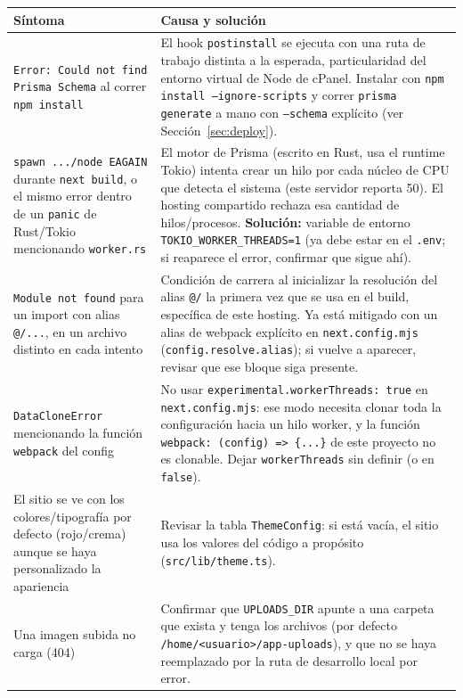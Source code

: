 \documentclass[11pt,a4paper]{article}
\begin{document}
\begin{longtable}{p{5.5cm}p{8.5cm}}
\toprule
\textbf{Síntoma} & \textbf{Causa y solución} \\
\midrule
\endhead

\texttt{Error: Could not find Prisma Schema} al correr \texttt{npm install} & El hook \texttt{postinstall} se ejecuta con una ruta de trabajo distinta a la esperada, particularidad del entorno virtual de Node de cPanel. Instalar con \texttt{npm install ---ignore-scripts} y correr \texttt{prisma generate} a mano con \texttt{--schema} explícito (ver Sección~\ref{sec:deploy}). \\
\midrule

\texttt{spawn .../node EAGAIN} durante \texttt{next build}, o el mismo error dentro de un \texttt{panic} de Rust/Tokio mencionando \texttt{worker.rs} & El motor de Prisma (escrito en Rust, usa el runtime Tokio) intenta crear un hilo por cada núcleo de CPU que detecta el sistema (este servidor reporta 50). El hosting compartido rechaza esa cantidad de hilos/procesos. \textbf{Solución:} variable de entorno \texttt{TOKIO\_WORKER\_THREADS=1} (ya debe estar en el \texttt{.env}; si reaparece el error, confirmar que sigue ahí). \\
\midrule

\texttt{Module not found} para un import con alias \texttt{@/...}, en un archivo distinto en cada intento & Condición de carrera al inicializar la resolución del alias \texttt{@/} la primera vez que se usa en el build, específica de este hosting. Ya está mitigado con un alias de webpack explícito en \texttt{next.config.mjs} (\texttt{config.resolve.alias}); si vuelve a aparecer, revisar que ese bloque siga presente. \\
\midrule

\texttt{DataCloneError} mencionando la función \texttt{webpack} del config & No usar \texttt{experimental.workerThreads: true} en \texttt{next.config.mjs}: ese modo necesita clonar toda la configuración hacia un hilo worker, y la función \texttt{webpack: (config) => \{...\}} de este proyecto no es clonable. Dejar \texttt{workerThreads} sin definir (o en \texttt{false}). \\
\midrule

El sitio se ve con los colores/tipografía por defecto (rojo/crema) aunque se haya personalizado la apariencia & Revisar la tabla \texttt{ThemeConfig}: si está vacía, el sitio usa los valores del código a propósito (\texttt{src/lib/theme.ts}). \\
\midrule

Una imagen subida no carga (404) & Confirmar que \texttt{UPLOADS\_DIR} apunte a una carpeta que exista y tenga los archivos (por defecto \texttt{/home/<usuario>/app-uploads}), y que no se haya reemplazado por la ruta de desarrollo local por error. \\

\bottomrule
\end{longtable}
\end{document}
